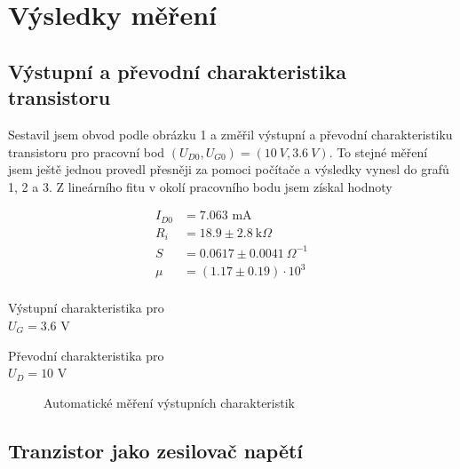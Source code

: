 \documentclass[a4paper,11pt]{article}
\begin{document}
\newpage

\section{Výsledky měření}

\subsection{Výstupní a převodní charakteristika transistoru}

Sestavil jsem obvod podle obrázku 1 a změřil výstupní a převodní charakteristiku transistoru pro pracovní bod $ (U_{D0}, U_{G0}) = ( 10 \ V, 3.6 \ V ) $. To stejné měření jsem ještě jednou provedl přesněji za pomoci počítače a výsledky vynesl do grafů 1, 2 a 3. Z lineárního fitu v okolí pracovního bodu jsem získal hodnoty

\begin{align*}
    I_{D0} &= 7.063 \text{ mA} \\
    R_i &=  18.9 \pm 2.8 \ \text{k}\Omega \\
    S &= 0.0617 \pm 0.0041 \ \Omega^{-1} \\
    \mu &= (1.17 \pm 0.19) \cdot 10^{3} \\ 
\end{align*}

\begin{table}[htpb]
    \begin{minipage}[b]{.5\linewidth}
        \centering
        
        \captionsetup{type=graph, justification=centering}
        \caption{Výstupní charakteristika pro \\ $ U_G = 3.6 $ V }
    \end{minipage} 
    \begin{minipage}[b]{.5\linewidth}
        \centering
        
        \captionsetup{type=graph, justification=centering}
        \caption{Převodní charakteristika pro \\ $ U_D = 10 $ V }
    \end{minipage} 
\end{table}

\begin{figure}[htpb]
    \centering
    
    \captionsetup{type=graph}
    \caption{Automatické měření výstupních charakteristik}
\end{figure}

\subsection{Tranzistor jako zesilovač napětí}
\end{document}
